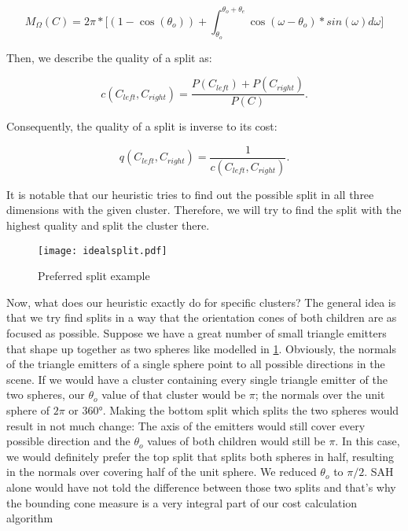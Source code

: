 \begin{equation}\label{eq:cone}
M_\Omega(C) = 2\pi * \bigg[(1-\cos(\theta_o)) + \int_{\theta_o}^{\theta_o + \theta_e}\cos(\omega - \theta_o) * sin(\omega)d\omega\bigg]
\end{equation} 

Then, we describe the quality of a split as:

\begin{equation}
c(C_{left}, C_{right}) = \frac{P(C_{left}) + P(C_{right})}{P(C)}.
\end{equation}

Consequently, the quality of a split is inverse to its cost:

\begin{equation}
q(C_{left}, C_{right}) = \frac{1}{c(C_{left}, C_{right})}.
\end{equation}

It is notable that our heuristic tries to find out the possible split in all three dimensions with the given cluster. Therefore, we will try to find the split with the highest quality and split the cluster there.

\begin{figure}
	\begin{center}
		\texttt{[image: idealsplit.pdf]}
		\caption{Preferred split example}
		\label{fig:idealsplit}
	\end{center}
\end{figure}


Now, what does our heuristic exactly do for specific clusters? The general idea is that we try find splits in a way that the orientation cones of both children are as focused as possible. Suppose we have a great number of small triangle emitters that shape up together as two spheres like modelled in \ref{fig:idealsplit}. Obviously, the normals of the triangle emitters of a single sphere point to all possible directions in the scene. If we would have a cluster containing every single triangle emitter of the two spheres, our $\theta_o$ value of that cluster would be $\pi$; the normals over the unit sphere of $2\pi$ or 360°. Making the bottom split which splits the two spheres would result in not much change: The axis of the emitters would still cover every possible direction and the $\theta_o$ values of both children would still be $\pi$. In this case, we would definitely prefer the top split that splits both spheres in half, resulting in the normals over covering half of the unit sphere. We reduced $\theta_o$ to $\pi/2$. SAH alone would have not told the difference between those two splits and that's why the bounding cone measure is a very integral part of our cost calculation algorithm

